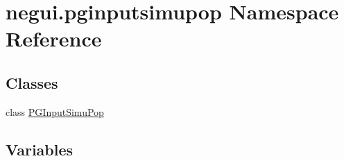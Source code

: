 \hypertarget{namespacenegui_1_1pginputsimupop}{}\section{negui.\+pginputsimupop Namespace Reference}
\label{namespacenegui_1_1pginputsimupop}
\subsection*{Classes}
\begin{DoxyCompactItemize}
\item 
class \hyperlink{classnegui_1_1pginputsimupop_1_1PGInputSimuPop}{P\+G\+Input\+Simu\+Pop}
\end{DoxyCompactItemize}
\subsection*{Variables}
